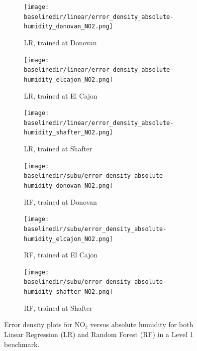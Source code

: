 \documentclass[journal abbreviation, manuscript]{copernicus}
\newcommand{\textus}[1]{$_{\text{#1}}$}
\begin{document}
\begin{figure}[H]
\centering
\begin{subfigure}{0.33\textwidth}
\texttt{[image: \\baselinedir/linear/error\_density\_absolute-humidity\_donovan\_NO2.png]}
\caption{LR, trained at Donovan}
\end{subfigure}
\begin{subfigure}{0.33\textwidth}
\texttt{[image: \\baselinedir/linear/error\_density\_absolute-humidity\_elcajon\_NO2.png]}
\caption{LR, trained at El Cajon}
\end{subfigure}
\begin{subfigure}{0.33\textwidth}
\texttt{[image: \\baselinedir/linear/error\_density\_absolute-humidity\_shafter\_NO2.png]}
\caption{LR, trained at Shafter}
\end{subfigure}
\begin{subfigure}{0.33\textwidth}
\texttt{[image: \\baselinedir/subu/error\_density\_absolute-humidity\_donovan\_NO2.png]}
\caption{RF, trained at Donovan}
\end{subfigure}
\begin{subfigure}{0.33\textwidth}
\texttt{[image: \\baselinedir/subu/error\_density\_absolute-humidity\_elcajon\_NO2.png]}
\caption{RF, trained at El Cajon}
\end{subfigure}
\begin{subfigure}{0.33\textwidth}
\texttt{[image: \\baselinedir/subu/error\_density\_absolute-humidity\_shafter\_NO2.png]}
\caption{RF, trained at Shafter}
\end{subfigure}
\caption{Error density plots for NO\textus{2} versus absolute humidity for both Linear Regression (LR) and Random Forest (RF) in a Level 1 benchmark.}
\label{fig:error-density-NO2-humidity}
\end{figure}
\end{document}
